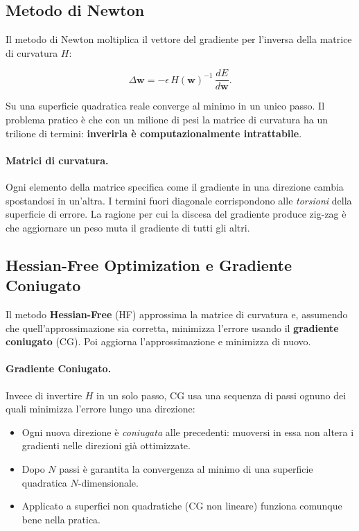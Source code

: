 \subsection{Metodo di Newton}
\label{subsec:newton}

Il metodo di Newton moltiplica il vettore del gradiente per l'inversa della
matrice di curvatura $H$:

\begin{equation}
  \Delta \mathbf{w} = -\epsilon\, H(\mathbf{w})^{-1}\, \frac{dE}{d\mathbf{w}}.
\end{equation}

Su una superficie quadratica reale converge al minimo in un unico passo. Il
problema pratico è che con un milione di pesi la matrice di curvatura ha un
trilione di termini: \textbf{inverirla è computazionalmente intrattabile}.

\paragraph{Matrici di curvatura.}
Ogni elemento della matrice specifica come il gradiente in una direzione cambia
spostandosi in un'altra. I termini fuori diagonale corrispondono alle
\emph{torsioni} della superficie di errore. La ragione per cui la discesa del
gradiente produce zig-zag è che aggiornare un peso muta il gradiente di tutti
gli altri.

\subsection{Hessian-Free Optimization e Gradiente Coniugato}
\label{subsec:hessian-free}

Il metodo \textbf{Hessian-Free} (HF) approssima la matrice di curvatura e,
assumendo che quell'approssimazione sia corretta, minimizza l'errore usando il
\textbf{gradiente coniugato} (CG). Poi aggiorna l'approssimazione e minimizza di
nuovo.

\paragraph{Gradiente Coniugato.}
Invece di invertire $H$ in un solo passo, CG usa una sequenza di passi ognuno
dei quali minimizza l'errore lungo una direzione:

\begin{itemize}
  \item Ogni nuova direzione è \emph{coniugata} alle precedenti: muoversi in
        essa non altera i gradienti nelle direzioni già ottimizzate.
  \item Dopo $N$ passi è garantita la convergenza al minimo di una superficie
        quadratica $N$-dimensionale.
  \item Applicato a superfici non quadratiche (CG non lineare) funziona comunque
        bene nella pratica.
\end{itemize}

